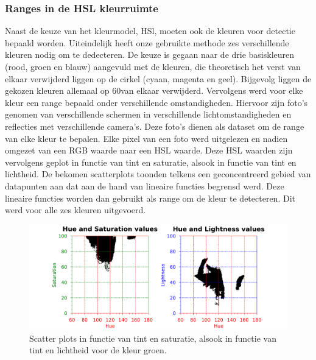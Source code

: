 \subsubsection{Ranges in de HSL kleurruimte} \label{Ranges}
Naast de keuze van het kleurmodel, HSl, moeten ook de kleuren voor detectie bepaald worden. Uiteindelijk heeft onze gebruikte methode zes verschillende kleuren nodig om te dedecteren. De keuze is gegaan naar de drie basiskleuren (rood, groen en blauw) aangevuld met de kleuren, die theoretisch het verst van elkaar verwijderd liggen op de cirkel (cyaan, magenta en geel). Bijgevolg liggen de gekozen kleuren allemaal op 60\degree van elkaar verwijderd. Vervolgens werd voor elke kleur een range bepaald onder verschillende omstandigheden. Hiervoor zijn foto's genomen van verschillende schermen in verschillende lichtomstandigheden en reflecties met verschillende camera's. Deze foto's dienen als dataset om de range van elke kleur te bepalen. Elke pixel van een foto werd uitgelezen en nadien omgezet van een RGB waarde naar een HSL waarde. Deze HSL waarden zijn vervolgens geplot in functie van tint en saturatie, alsook in functie van tint en lichtheid. De bekomen scatterplots toonden telkens een geconcentreerd gebied van datapunten aan dat aan de hand van lineaire functies begrensd werd. Deze lineaire functies worden dan gebruikt als range om de kleur te detecteren. Dit werd voor alle zes kleuren uitgevoerd. \cite{TSAI20121291}

\begin{figure}[h!]
\centering
\includegraphics[width=\textwidth]{img/hslGreen.png}
\caption{Scatter plots in functie van tint en saturatie, alsook in functie van tint en lichtheid voor de kleur groen.}
\end{figure}

